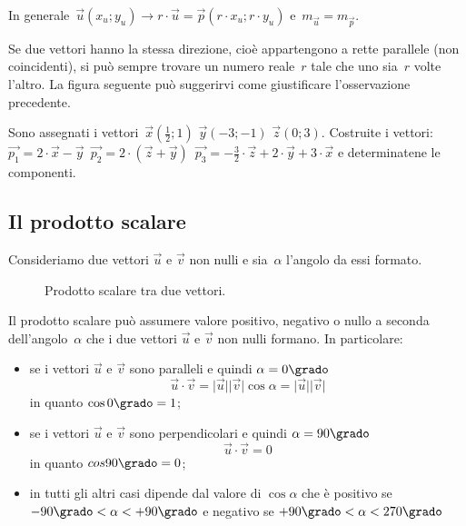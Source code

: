In generale~$\vec{u}(x_u;y_u) \rightarrow r \cdot \vec{u}=
             \vec{p}(r \cdot x_u; 
             r \cdot y_u)$ e~$m_{\vec{u}}=m_{\vec{p}}$.
   
\begin{osservazione}
Se due vettori hanno la stessa direzione, cioè appartengono a rette parallele 
(non coincidenti), si può sempre trovare un numero reale~$r$
tale che uno sia~$r$ volte l'altro. La figura seguente può suggerirvi come 
giustificare l'osservazione precedente.
\begin{center}
 
\end{center}
\end{osservazione}

\begin{esempio}

Sono assegnati i vettori~$\vec{x}(\frac {1}{2};1)$ $\vec{y}(-3;-1)$ 
$\vec{z}(0;3)$.
Costruite i vettori:~$\vec{p_1}=2 \cdot \vec{x}-\vec{y}$\, $\vec{p_2}=2 \cdot 
(\vec{z}+\vec{y})$\, $\vec{p_3}=-\frac {3}{2} \cdot \vec{z} +2 \cdot \vec{y}+3 
\cdot \vec{x}$
e determinatene le componenti.
\end{esempio}

\subsection{Il prodotto scalare}

Consideriamo due vettori $\vec{u}$ e $\vec{v}$ non nulli e 
sia~$\alpha$ l'angolo da essi formato.

\begin{inaccessibleblock}
 \begin{figure}[t]
 \centering
  
 \caption{Prodotto scalare tra due vettori.}
 \label{fig:vett_prodotto_scalare}
\end{figure}
\end{inaccessibleblock}
                  
Il prodotto scalare può assumere valore positivo, negativo o nullo a seconda 
dell'angolo~$\alpha$ che i due vettori $\vec{u}$ e $\vec{v}$ non nulli formano. 
In particolare:
\begin{itemize}
 \item se i vettori $\vec{u}$ e $\vec{v}$ sono paralleli e 
  quindi $\alpha=0\grado$
  \[\vec{u} \cdot \vec{v} = \lvert\vec{u}\rvert\lvert\vec{v}\rvert \cos \alpha=
    \lvert\vec{u}\rvert\lvert\vec{v}\rvert\] 
  in quanto $\cos 0\grado = 1$;
 \item se i vettori $\vec{u}$ e $\vec{v}$ sono perpendicolari e 
  quindi $\alpha=90\grado$
  \[\vec{u} \cdot \vec{v} = 0\] 
  in quanto $cos 90\grado = 0$;
 \item in tutti gli altri casi dipende dal valore di $\cos \alpha$ che è 
  positivo se $-90\grado < \alpha < +90\grado$ e negativo 
  se $+90\grado < \alpha < 270\grado$
\end{itemize}

